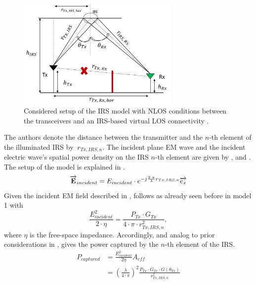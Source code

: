 \begin{figure}[tb] %
	\centering
	\vspace{12pt} %
	\includegraphics*[width=0.7\textwidth]{images/Section 2 Images/model2}
	\caption{Considered setup of the IRS model with NLOS conditions between the transceivers and an IRS-based virtual LOS connectivity \cite{ntontin2021optimal}.}
	\label{fig:model2} 
\end{figure}
The authors denote the distance between the transmitter and the $n$-th element of the illuminated IRS by $\ r_{Tx, IRS, n}$. The incident plane EM wave and the incident electric wave's spatial power density on the IRS $n$-th element are given by , and . The setup of the model is explained in  .
\begin{equation} \label{Eq:model2 electric field}
	\overrightarrow{\textbf{E}}_{incident}=E_{incident} \cdot e^{-j \frac{2 \cdot \pi}{\lambda} r_{Tx, IRS, n}} {\overrightarrow{e_x}}\\
\end{equation}
Given the incident EM field described in ,  follows as already seen before in model 1 with
\begin{equation} \label{Eq: model 2 incident electric wave's spatial power density}
	\frac{E_{incident}^2}{2 \cdot \eta} = \frac{P_{Tx} \cdot G_{Tx}}{4 \cdot \pi \cdot r_{Tx,IRS, n}^2},
\end{equation}
where  $\eta$ is the free-space impedance. Accordingly, and analog to prior considerations in \cite{8936989},  gives the power captured by the $n$-th element of the \ac{IRS}.
\begin{equation} \label{Eq: model 2 power captured by the nth element}
	\begin{aligned}
		P_{captured} &= \frac{E_{incident}^2}{2 \eta} A_{eff} \\
		&=\left( \frac{\lambda}{4 \cdot \pi} \right)^2 \frac{P_{Tx} \cdot G_{Tx} \cdot G(\theta_{Tx})}{r_{Tx,IRS, n}^2}
	\end{aligned}
\end{equation}
